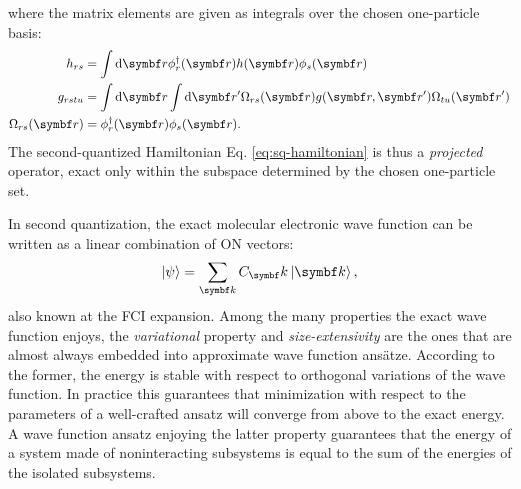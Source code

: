 where the matrix elements are given as integrals over the chosen
one-particle basis:
\begin{subequations}
 \begin{align}
   h_{rs} &= \int \diff\vect{r} \phi_r^\dagger(\vect{r}) h(\vect{r})\phi_s(\vect{r}) \label{eq:one-el}\\
   g_{rstu} &=
   \int\diff\vect{r}\int\diff\vect{r}^\prime
   \Omega_{rs}(\vect{r}) g(\vect{r},\vect{r}^\prime) \Omega_{tu}(\vect{r}^\prime) \label{eq:two-el} \\
  \Omega_{rs}(\vect{r}) &= \phi_r^\dagger(\vect{r})\phi_s(\vect{r}). \label{eq:overlap}
 \end{align}
\end{subequations}
The second-quantized Hamiltonian Eq. \eqref{eq:sq-hamiltonian} is thus a
\emph{projected} operator, exact only within the subspace determined by
the chosen one-particle set.\autocite{Gross1991-hi, Helgaker2000-tz}

In second quantization, the exact molecular electronic wave function can
be written as a linear combination of \acrshort{ON} vectors:
\begin{equation}\label{eq:fci}
  \ket{\psi} = \sum_{\vect{k}}C_\vect{k}\ket{\vect{k}},
\end{equation}
also known at the \gls{FCI} expansion.
Among the many properties the exact wave function enjoys, the
\emph{variational} property and \emph{size-extensivity} are the ones
that are almost always embedded into approximate wave function ans\"{a}tze.\autocite{Helgaker2000-tz}
According to the former, the energy is stable with respect to orthogonal
variations of the wave function. In practice this guarantees that
minimization with respect to the parameters of a well-crafted ansatz
will converge from above to the exact energy.\autocite{Szabo1989-vl, McWeeny1992-oj, Helgaker2000-tz}
A wave function ansatz enjoying the latter property guarantees that the
energy of a system made of noninteracting subsystems is equal to the sum of
the energies of the isolated subsystems.\autocite{Helgaker2000-tz, Nooijen2005-ux}

